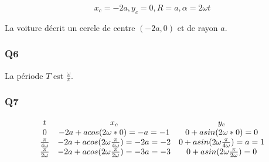 \documentclass[]{book}
\theoremstyle{definition}
\begin{document}
$$x_c = -2a, y_c = 0, R = a, \alpha = 2 \omega t$$

La voiture d\'ecrit un cercle de centre $(-2a,0)$ et de rayon $a$.


\subsubsection*{Q6}
La p\'eriode $T$ est $\frac{\omega}{\pi}$.

\subsubsection*{Q7}
$$
\begin{array}{c c c}
  t & x_c & y_c  \\
  0 & -2a + a cos(2 \omega * 0) = -a = -1 & 0 + a
  sin(2 \omega * 0) = 0\\
  \frac{\pi}{4 \omega}  & -2a + a cos(2 \omega  \frac{\pi}{4 \omega})
  = -2a = -2 & 0 + a
  sin(2 \omega \frac{\pi}{4 \omega}) = a = 1\\
  \frac{\pi}{2 \omega}  & -2a + a cos(2 \omega  \frac{\pi}{2 \omega})
  = -3a = -3 & 0 + a
  sin(2 \omega \frac{\pi}{2 \omega}) = 0  \\
\end{array}
$$
\end{document}
